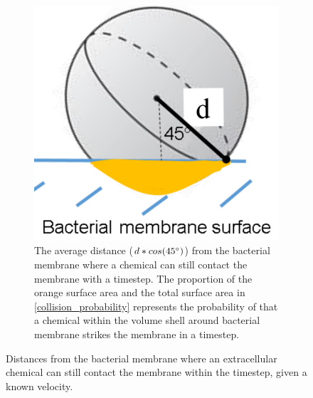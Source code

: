 \begin{supplementary}
\begin{figure}
\begin{subfigure}[b]{0.47\textwidth}
        \includegraphics[width = \textwidth]{images/WCMpy/average_far.png}
        \caption{
            The average distance ($d*cos(45\degree)$) from the bacterial membrane where a chemical can still contact the membrane with a timestep. The proportion of the orange surface area and the total surface area in \cref{collision_probability} represents the probability of that a chemical within the volume shell around bacterial membrane strikes the membrane in a timestep.
        }
    \end{subfigure}
    \caption{
          Distances from the bacterial membrane where an extracellular chemical can still contact the membrane within the timestep, given a known velocity.
    }
    \label{diffusion_distances}
\end{figure}


\end{supplementary}
